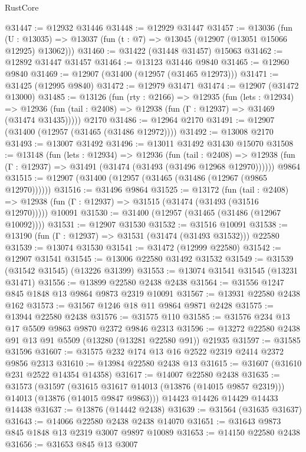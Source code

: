 \begin{lexlean}{RustCore}
\begin{coremodule}
@31447 := @12932 @31446
@31448 := @12929 @31447
@31457 := @13036
    (fun (U : @13035) => @13037 (fun (t : @7) => @13045 (@12907 (@13051 @15066 @12925) @13062)))
@31460 := @31422 (@31448 @31457) @15063
@31462 := @12892 @31447 @31457
@31464 := @13123 @31446 @9840
@31465 := @12960 @9840
@31469 := @12907 (@31400 (@12957 (@31465 @12973)))
@31471 := @31425 (@12995 @9840)
@31472 := @12979 @31471
@31474 := @12907 (@31472 @13000)
@31485 := @13126
    (fun (rty : @2166) =>
    @12935
      (fun (lets : @12934) =>
      @12936 (fun (tail : @2408) => @12938 (fun (Γ : @12937) => @31469 (@31474 @31435)))))
    @2170
@31486 := @12964 @2170
@31491 := @12907 (@31400 (@12957 (@31465 (@31486 @12972))))
@31492 := @13008 @2170
@31493 := @13007 @31492
@31496 := @13011 @31492 @31430 @15070
@31508 := @13148
    (fun (lets : @12934) =>
    @12936
      (fun (tail : @2408) =>
      @12938 (fun (Γ : @12937) => @31491 (@31474 (@31493 (@31496 @12968 @12970))))))
    @9864
@31515 := @12907 (@31400 (@12957 (@31465 (@31486 (@12967 (@9865 @12970))))))
@31516 := @31496 @9864
@31525 := @13172
    (fun (tail : @2408) => @12938 (fun (Γ : @12937) => @31515 (@31474 (@31493 (@31516 @12970)))))
    @10091
@31530 := @31400 (@12957 (@31465 (@31486 (@12967 @10092))))
@31531 := @12907 @31530
@31532 := @31516 @10091
@31538 := @13190 (fun (Γ : @12937) => @31531 (@31474 (@31493 @31532))) @22580
@31539 := @13074 @31530
@31541 := @31472 (@12999 @22580)
@31542 := @12907 @31541
@31545 := @13006 @22580 @31492 @31532
@31549 := @31539 (@31542 @31545) (@13226 @31399)
@31553 := @13074 @31541 @31545 (@13231 @31471)
@31556 := @13899 @22580 @2438 @2438
@31564 := @31556 @1247 @845 @1848 @13 @9864 @9873 @2319 @10091
@31567 := @13931 @22580 @2438 @162
@31573 := @31567 @1246 @18 @11 @9864 @9871 @2428
@31575 := @13944 @22580 @2438
@31576 := @31575 @110
@31585 := @31576 @234 @13 @17 @5509 @9863 @9870 @2372 @9846 @2313
@31596 := @13272 @22580 @2438 @91 @13 @91 @5509 (@13280 (@13281 @22580 @91)) @21935
@31597 := @31585 @31596
@31607 := @31575 @232 @174 @13 @16 @2522 @2319 @2414 @2372 @9856 @2313
@31610 := @13984 @22580 @2438 @13
@31615 := @31607 (@31610 @231 @2522 @14354 @14358)
@31617 := @14007 @22580 @2438
@31635 := @31573
    (@31597
      (@31615 @31617 @14013 (@13876 (@14015 @9857 @2319)))
      @14013
      (@13876 (@14015 @9847 @9863)))
    @14423
    @14426
    @14429
    @14433
    @14438
@31637 := @13876 (@14442 @2438)
@31639 := @31564 (@31635 @31637)
@31643 := @14066 @22580 @2438 @2438 @14070
@31651 := @31643 @9873 @845 @1848 @13 @2319 @3007 @9897 @10089
@31653 := @14150 @22580 @2438
@31656 := @31653 @845 @13 @3007

\end{coremodule}
\end{lexlean}
